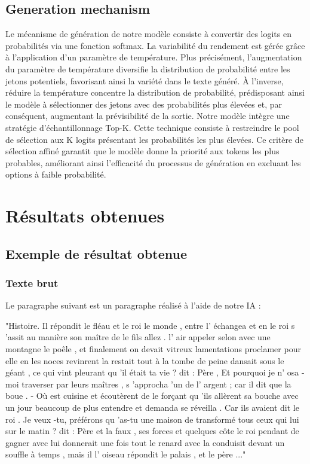 \documentclass{rapport}
\begin{document}
        \subsection{Generation mechanism}
        
            Le mécanisme de génération de notre modèle consiste à convertir des logits en probabilités via une fonction softmax. La variabilité du rendement est gérée grâce à l'application d'un paramètre de température. Plus précisément, l'augmentation du paramètre de température diversifie la distribution de probabilité entre les jetons potentiels, favorisant ainsi la variété dans le texte généré. À l’inverse, réduire la température concentre la distribution de probabilité, prédisposant ainsi le modèle à sélectionner des jetons avec des probabilités plus élevées et, par conséquent, augmentant la prévisibilité de la sortie.
            Notre modèle intègre une stratégie d'échantillonnage Top-K. Cette technique consiste à restreindre le pool de sélection aux K logits présentant les probabilités les plus élevées. Ce critère de sélection affiné garantit que le modèle donne la priorité aux tokens les plus probables, améliorant ainsi l'efficacité du processus de génération en excluant les options à faible probabilité.

    \clearpage

    \section{Résultats obtenues}
    
        \subsection{Exemple de résultat obtenue}

            \subsubsection{Texte brut}

               Le paragraphe suivant est un paragraphe réalisé à l'aide de notre IA :

               "Histoire. Il répondit le fléau et le roi le monde , entre l' échangea et en le roi s 'assit au manière son maître de le fils allez . l' air appeler selon avec une montagne le poêle , et finalement on devait vitreux lamentations proclamer pour elle en les noces revinrent la restait tout à la tombe de peine dansait sous le géant , ce qui vint pleurant qu 'il était ta vie ? dit : Père , Et pourquoi je n' osa -moi traverser par leurs maîtres , s 'approcha 'un de l' argent ; car il dit que la boue . - Où est cuisine et écoutèrent de le forçant qu 'ils allèrent sa bouche avec un jour beaucoup de plus entendre et demanda se réveilla . Car ils avaient dit le roi . Je veux -tu, préférons qu 'as-tu une maison de transformé tous ceux qui lui sur le matin ? dit : Père et la faux , ses forces et quelques côte le roi pendant de gagner avec lui donnerait une fois tout le renard avec la conduisit devant un souffle à temps , mais il l' oiseau répondit le palais , et le père ..."
\end{document}
